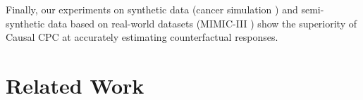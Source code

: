 \documentclass{article}
\theoremstyle{plain}
\theoremstyle{definition}
\theoremstyle{remark}
\begin{document}
Finally, our experiments on synthetic data (cancer simulation \citep{PK-PD}) and semi-synthetic data based on real-world datasets (MIMIC-III \citep{johnson2016mimic}) show the superiority of Causal CPC at accurately estimating counterfactual responses.

\section{Related Work}
\label{sect: related_work}
\end{document}
